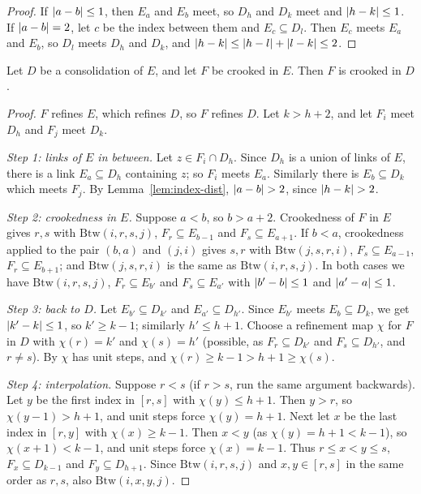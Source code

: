 \begin{proof}
If $\left\lvert a-b\right\rvert\le1$, then $E_a$ and $E_b$ meet, so $D_h$ and $D_k$ meet and $\left\lvert h-k\right\rvert\le1$. If
$\left\lvert a-b\right\rvert=2$, let $c$ be the index between them and $E_c\subseteq D_l$. Then $E_c$ meets $E_a$ and $E_b$,
so $D_l$ meets $D_h$ and $D_k$, and $\left\lvert h-k\right\rvert\le\left\lvert h-l\right\rvert+\left\lvert l-k\right\rvert\le2$.
\end{proof}


\begin{theorem}\label{thm:bing1}
Let $D$ be a consolidation of $E$, and let $F$ be crooked in $E$. Then $F$ is crooked in $D$.
\end{theorem}

\begin{proof}
$F$ refines $E$, which refines $D$, so $F$ refines $D$. Let $k>h+2$, and let $F_i$ meet $D_h$ and $F_j$ meet
$D_k$.

\emph{Step 1: links of $E$ in between.} Let $z\in F_i\cap D_h$. Since $D_h$ is a union of links of $E$,
there is a link $E_a\subseteq D_h$ containing $z$; so $F_i$ meets $E_a$. Similarly there is $E_b\subseteq D_k$
which meets $F_j$. By Lemma~\ref{lem:index-dist}, $\left\lvert a-b\right\rvert>2$, since $\left\lvert h-k\right\rvert>2$.

\emph{Step 2: crookedness in $E$.} Suppose $a<b$, so $b>a+2$. Crookedness of $F$ in $E$ gives $r,s$ with
$\mathrm{Btw}(i,r,s,j)$, $F_r\subseteq E_{b-1}$ and $F_s\subseteq E_{a+1}$. If $b<a$, crookedness applied to
the pair $(b,a)$ and $(j,i)$ gives $s,r$ with $\mathrm{Btw}(j,s,r,i)$, $F_s\subseteq E_{a-1}$, $F_r\subseteq
E_{b+1}$; and $\mathrm{Btw}(j,s,r,i)$ is the same as $\mathrm{Btw}(i,r,s,j)$. In both cases we have
$\mathrm{Btw}(i,r,s,j)$, $F_r\subseteq E_{b'}$ and $F_s\subseteq E_{a'}$ with $\left\lvert b'-b\right\rvert\le1$ and
$\left\lvert a'-a\right\rvert\le1$.

\emph{Step 3: back to $D$.} Let $E_{b'}\subseteq D_{k'}$ and $E_{a'}\subseteq D_{h'}$. Since $E_{b'}$ meets
$E_b\subseteq D_k$, we get $\left\lvert k'-k\right\rvert\le1$, so $k'\ge k-1$; similarly $h'\le h+1$. Choose a refinement map
$\chi$ for $F$ in $D$ with $\chi(r)=k'$ and $\chi(s)=h'$ (possible, as $F_r\subseteq D_{k'}$ and $F_s\subseteq
D_{h'}$, and $r\neq s$). By  $\chi$ has unit steps, and $\chi(r)\ge k-1>h+1\ge\chi(s)$.

\emph{Step 4: interpolation.} Suppose $r<s$ (if $r>s$, run the same argument backwards). Let $y$ be the
first index in $[r,s]$ with $\chi(y)\le h+1$. Then $y>r$, so $\chi(y-1)>h+1$, and unit steps force
$\chi(y)=h+1$. Next let $x$ be the last index in $[r,y]$ with $\chi(x)\ge k-1$. Then $x<y$ (as $\chi(y)=h+1<k-1$),
so $\chi(x+1)<k-1$, and unit steps force $\chi(x)=k-1$. Thus $r\le x<y\le s$, $F_x\subseteq D_{k-1}$ and
$F_y\subseteq D_{h+1}$. Since $\mathrm{Btw}(i,r,s,j)$ and $x,y\in[r,s]$ in the same order as $r,s$, also
$\mathrm{Btw}(i,x,y,j)$.
\end{proof}

